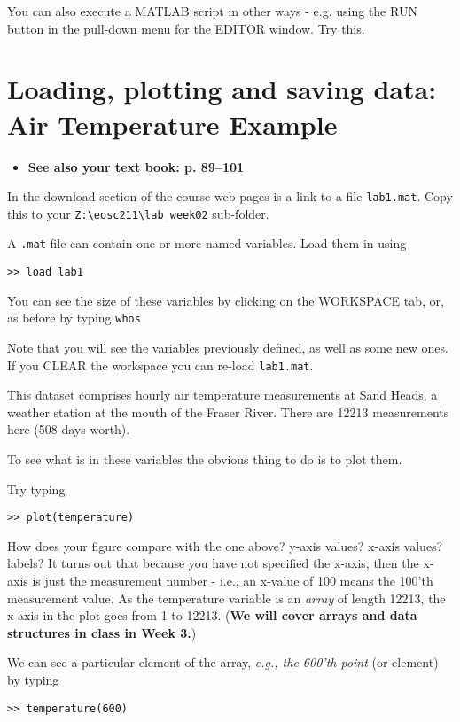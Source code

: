 \documentclass[letterpaper]{article}
\begin{document}
You can also execute a MATLAB script in other ways - e.g. using the RUN button in the pull-down menu for the EDITOR window.  Try this.


\section{Loading, plotting and saving data:  Air Temperature Example}

\begin{itemize}
\item {\bf See also your text book: p. 89--101} 
\end{itemize}

In the download section of the course web pages is a link to a file
\verb+lab1.mat+. Copy this to your \verb+Z:\eosc211\lab_week02+ sub-folder.

A \verb+.mat+ file can contain one or more named variables. Load them in
using
\begin{verbatim}
>> load lab1
\end{verbatim}

You can see the size of these variables by clicking on the WORKSPACE tab, or, as before
by typing \verb+whos+

Note that you will see the variables previously defined, as well as some new
ones. If you CLEAR the workspace you can re-load \verb+lab1.mat+.

This dataset comprises hourly air temperature measurements at Sand Heads,
a weather station at the mouth of the Fraser River. There are 12213
measurements here (508 days worth). 


To see what is in these variables the obvious thing to 
do is to plot them.

Try typing

\begin{verbatim}
>> plot(temperature)
\end{verbatim}

How does your  figure compare with the one above? y-axis values?  x-axis values? labels?
It turns out that because you have not specified the x-axis, then the x-axis is just the
measurement number - i.e., an x-value of 100 means the 100'th measurement value.
As the temperature variable is an {\it array} 
of length 12213, the x-axis in the plot goes from 1 to 12213.  ({\bf We will cover arrays and data structures in class in Week 3.})

We can see a particular element of the array, {\it e.g., the 600'th point} (or element) by typing
\begin{verbatim}
>> temperature(600)
\end{verbatim}
\end{document}
